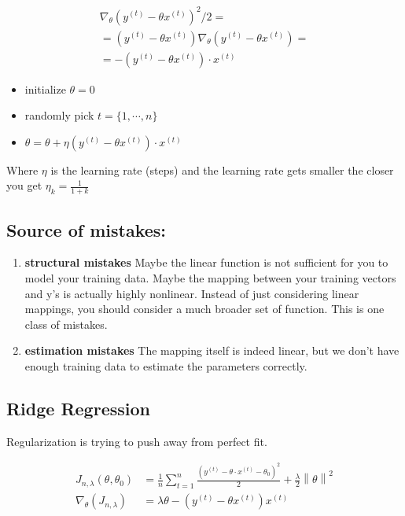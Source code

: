 \begin{align*}
\nabla_{\theta}(y^{(t)} - \theta x^{(t)})^2 / 2 =\\
= (y^{(t)} - \theta x^{(t)}) \nabla_{\theta}(y^{(t)} - \theta x^{(t)}) = \\
= -(y^{(t)} - \theta x^{(t)}) \cdot x^{(t)}
\end{align*}


\begin{itemize}
\item initialize $\theta=0$
\item randomly pick $t=\{1,\cdots,n\}$
\item $\theta = \theta + \eta(y^{(t)} - \theta x^{(t)}) \cdot x^{(t)}$
\end{itemize}

Where $\eta$ is the learning rate (steps) and the learning rate gets smaller the closer you get $\eta_k = \frac{1}{1+k}$ 


\subsection{Source of mistakes:}
\begin{enumerate}
	\item \textbf{structural mistakes} Maybe the linear function is not sufficient for you to model
your training data. Maybe the mapping between your training vectors and y’s is
actually highly nonlinear. Instead of just considering linear mappings, you should
consider a much broader set of function. This is one class of mistakes. 
	\item \textbf{estimation mistakes} The mapping itself is indeed linear, but we don’t have
enough training data to estimate the parameters correctly.
\end{enumerate}




\subsection{Ridge Regression}
Regularization is trying to push away from perfect fit.

\begin{align*}
J_{n, \lambda } (\theta , \theta _0) &= \frac{1}{n} \sum _{t=1}^{n} \frac{(y^{(t)} - \theta \cdot x^{(t)}-\theta _0)^2}{2} + \frac{\lambda }{2} \left\|  \theta  \right\| ^2\\
\nabla_{\theta}(J_{n, \lambda })&= \lambda \theta - (y^{(t)}-\theta x^{(t)})x^{(t)}
\end{align*}

